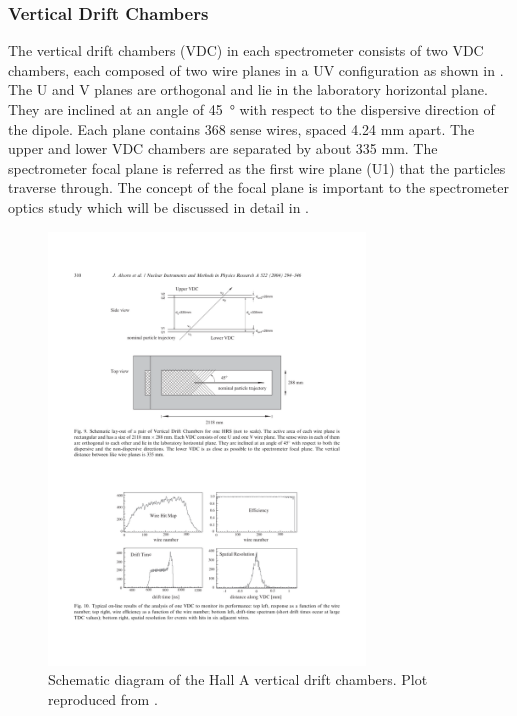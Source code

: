 \subsubsection{Vertical Drift Chambers}

The vertical drift chambers (VDC) in each spectrometer consists of two VDC chambers, each composed of two wire planes in a UV configuration \cite{Fissum2001} as shown in . The U and V planes are orthogonal and lie in the laboratory horizontal plane. They are inclined at an angle of \SI{45}{\degree} with respect to the dispersive direction of the dipole. Each plane contains 368 sense wires, spaced 4.24 mm apart. The upper and lower VDC chambers are separated by about 335 mm. The spectrometer focal plane is referred as the first wire plane (U1) that the particles traverse through. The concept of the focal plane is important to the spectrometer optics study which will be discussed in detail in .

\begin{figure}[b!]
  \centering
  \includegraphics[width=0.75\textwidth]{figs/VDC.pdf}
  \caption[Schematic diagram of the Hall A vertical drift chambers.]{Schematic diagram of the Hall A vertical drift chambers. Plot reproduced from \cite{Alcorn2004}. \label{C5S4SS2F2}}
\end{figure}

